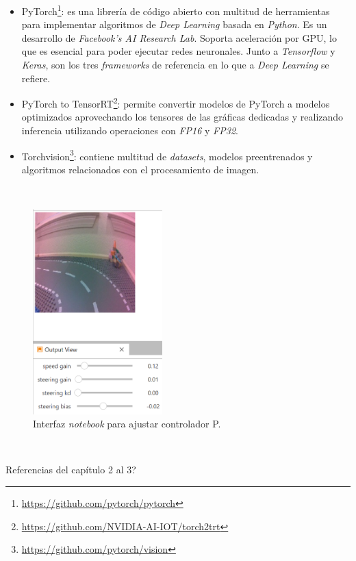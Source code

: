 \begin{itemize}
	\item PyTorch\footnote{\url{https://github.com/pytorch/pytorch}}: es una librería de código abierto con multitud de herramientas para implementar algoritmos de \textit{Deep Learning} basada en \textit{Python}\cite{autopilottesla}. Es un desarrollo de \textit{Facebook's AI Research Lab}. Soporta aceleración por GPU, lo que es esencial para poder ejecutar redes neuronales. Junto a \textit{Tensorflow} y \textit{Keras}, son los tres \textit{frameworks} de referencia en lo que a \textit{Deep Learning} se refiere.
	\item PyTorch to TensorRT\footnote{\url{https://github.com/NVIDIA-AI-IOT/torch2trt}}: permite convertir modelos de PyTorch a modelos optimizados aprovechando los tensores de las gráficas dedicadas y realizando inferencia utilizando operaciones con \textit{FP16} y \textit{FP32}.
	\item Torchvision\footnote{\url{https://github.com/pytorch/vision}}: contiene multitud de \textit{datasets}, modelos preentrenados y algoritmos relacionados con el procesamiento de imagen.
\end{itemize}\

\begin{figure} [h!]
	\begin{center}
		\includegraphics[width=5cm]{figs/livejetracer}
	\end{center}
	\caption{Interfaz \textit{notebook} para ajustar controlador P.}
	\label{fig:livejetracer}
\end{figure}\

Referencias del capítulo 2 al 3?\\